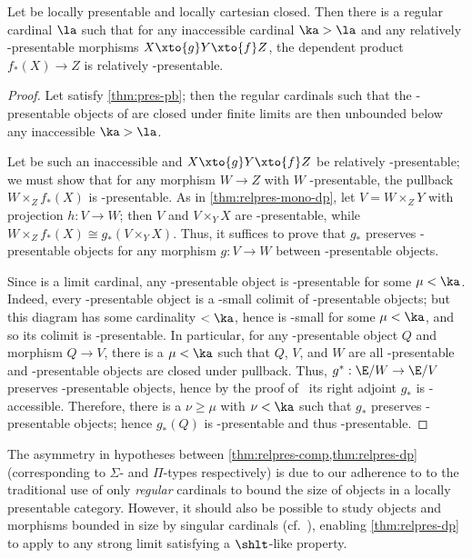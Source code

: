 \begin{lem}\label{thm:relpres-dp}
  Let \E be locally presentable and locally cartesian closed.
  Then there is a regular cardinal $\la$ such that for any inaccessible cardinal $\ka>\la$ and any relatively \ka-presentable morphisms $X \xto{g} Y \xto{f} Z$, the dependent product $f_*(X) \to Z$ is relatively \ka-presentable.
\end{lem}
\begin{proof}
  Let \la satisfy \cref{thm:pres-pb}; then the regular cardinals \mu such that the \mu-presentable objects of \E are closed under finite limits are then unbounded below any inaccessible $\ka>\la$.

  Let \ka be such an inaccessible and $X \xto{g} Y \xto{f} Z$ be relatively \ka-presentable; we must show that for any morphism $W\to Z$ with $W$ \ka-presentable, the pullback $W\times_Z f_*(X)$ is \ka-presentable.
  As in \cref{thm:relpres-mono-dp}, let $V = W\times_Z Y$ with projection $h:V\to W$; then $V$ and $V\times_Y X$ are \ka-presentable, while $W\times_Z f_*(X) \cong g_*(V\times_Y X)$.
  Thus, it suffices to prove that $g_*$ preserves \ka-presentable objects for any morphism $g:V\to W$ between \ka-presentable objects.

  Since \ka is a limit cardinal, any \ka-presentable object is \mu-presentable for some $\mu<\ka$.
  Indeed, every \ka-presentable object is a \ka-small colimit of \la-presentable objects; but this diagram has some cardinality $<\ka$, hence is \mu-small for some $\mu<\ka$, and so its colimit is \mu-presentable.
  In particular, for any \ka-presentable object $Q$ and morphism $Q\to V$, there is a $\mu<\ka$ such that $Q$, $V$, and $W$ are all \mu-presentable and \mu-presentable objects are closed under pullback.
  Thus, $g^*:\E/W \to \E/V$ preserves \mu-presentable objects, hence by the proof of~\cite[Proposition 2.23]{ar:loc-pres} its right adjoint $g_*$ is \mu-accessible.
  Therefore, there is a $\nu\ge \mu$ with $\nu<\ka$ such that $g_*$ preserves \nu-presentable objects; hence $g_*(Q)$ is \nu-presentable and thus \ka-presentable.
\end{proof}

\begin{rmk}
  The asymmetry in hypotheses between \cref{thm:relpres-comp,thm:relpres-dp} (corresponding to $\Sigma$- and $\Pi$-types respectively) is due to our adherence to to the traditional use of only \emph{regular} cardinals to bound the size of objects in a locally presentable category.
  However, it should also be possible to study objects and morphisms bounded in size by singular cardinals (cf.~\cite{lrv:intsize}), enabling \cref{thm:relpres-dp} to apply to any strong limit \ka satisfying a $\shlt$-like property.
\end{rmk}


